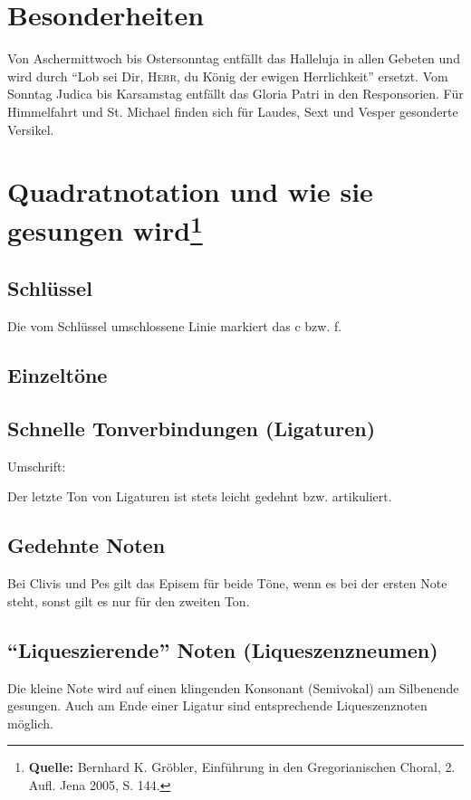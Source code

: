 \section*{Besonderheiten}
Von Aschermittwoch bis Ostersonntag entfällt das Halleluja in allen Gebeten und
wird durch \enquote{Lob sei Dir, \textsc{Herr}, du König der ewigen
Herrlichkeit} ersetzt. Vom Sonntag Judica bis Karsamstag entfällt das Gloria
Patri in den Responsorien. Für Himmelfahrt und St. Michael finden sich für
Laudes, Sext und Vesper gesonderte Versikel.
\section*{Quadratnotation und wie sie gesungen wird\protect\footnote{\textbf{Quelle:} Bernhard K. Gröbler, Einführung in den Gregorianischen Choral, 2. Aufl. Jena 2005, S. 144.}}
\subsection*{Schlüssel}
Die vom Schlüssel umschlossene Linie markiert das c bzw. f.
\subsection*{Einzeltöne}
\par
\subsection*{Schnelle Tonverbindungen (Ligaturen)}
Umschrift:\par
{%
\parindent 0pt
\noindent
\ifx\preLilyPondExample \undefined
\else
  \expandafter\preLilyPondExample
\fi
\def\lilypondbook{}%

\ifx\postLilyPondExample \undefined
\else
  \expandafter\postLilyPondExample
\fi
}\par
Der letzte Ton von Ligaturen ist stets leicht gedehnt bzw. artikuliert.
\subsection*{Gedehnte Noten}
Bei Clivis und Pes gilt das Episem für beide Töne, wenn es bei der ersten Note
steht, sonst gilt es nur für den zweiten Ton.
\subsection*{\enquote{Liqueszierende} Noten (Liqueszenzneumen)}
Die kleine Note wird auf einen klingenden Konsonant (Semivokal) am Silbenende
gesungen. Auch am Ende einer Ligatur sind entsprechende Liqueszenznoten möglich.
